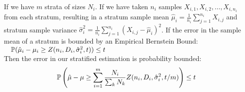 \begin{theorem}\label{triangle_theorem1}
If we have $m$ strata of sizes $N_i$. If we have taken $n_i$ samples $X_{i,1},X_{i,2},\dots,X_{i,n_i}$ from each stratum, resulting in a stratum sample mean $\hat{\mu}_i = \frac{1}{n_i}\sum_{j=1}^{n_i}X_{i,j}$ and stratum sample variance $\hat{\sigma}_i^2=\frac{1}{n_i}\sum_{j=1}^{n_i}(X_{i,j}-\hat{\mu}_i)^2 $.
If the error in the sample mean of a stratum is bounded by an Empirical Bernstein Bound:
$\quad \operatorname{\mathbb{P}}(\hat{\mu}_i-\mu_i \ge Z(n_i,D_i,\hat{\sigma}^2_i,t)) \le t $\\
Then the error in our stratified estimation \DIFaddbegin {}\DIFaddend is probability bounded:
$$ \operatorname{\mathbb{P}}\left(\hat{\mu}-\mu \ge \sum_{i=1}^m\frac{N_i}{\sum_kN_k} Z(n_i,D_i,\hat{\sigma}^2_i,t/m)\right)\le t $$
\end{theorem}



